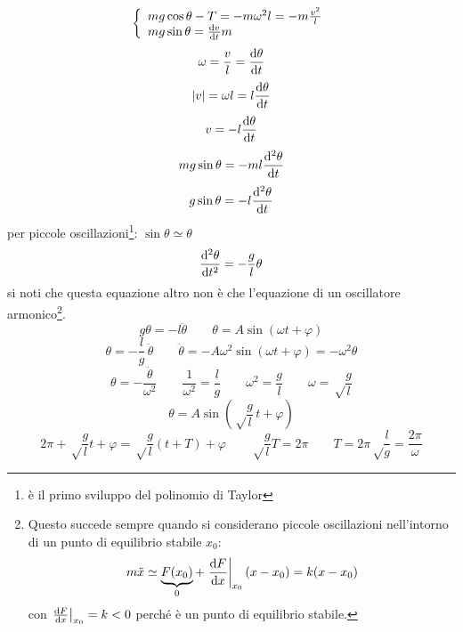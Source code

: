 \begin{equation*}\left\{
  \begin{array}{l}
  mg\cos\theta-T=-m\omega^2l=-m\frac{v^2}{l}\\
  mg\sin\theta=\frac{\mathrm{d} v}{\mathrm{d} t}m
  \end{array}
  \right.\end{equation*}
\begin{equation*}\omega=\frac{v}{l}=\frac{\mathrm{d}\theta}{\mathrm{d} t}\end{equation*}
\begin{equation*}|v|=\omega l=l\frac{\mathrm{d}\theta}{\mathrm{d} t}\end{equation*}
\begin{equation*}v=-l\frac{\mathrm{d}\theta}{\mathrm{d} t}\end{equation*}
\begin{equation*}mg\sin\theta=-ml\frac{\mathrm{d}^2\theta}{\mathrm{d} t}\end{equation*}
\begin{equation*}g\sin\theta=-l\frac{\mathrm{d}^2\theta}{\mathrm{d} t}\end{equation*}
per piccole oscillazioni\footnote{è il primo sviluppo del polinomio di Taylor}: $\sin\theta\simeq\theta$
\begin{equation*}\frac{\mathrm{d}^2\theta}{\mathrm{d} t^2}=-\frac{g}{l}\theta\end{equation*}
si noti che questa equazione altro non è che l'equazione di un oscillatore armonico\footnote{Questo succede sempre quando si considerano piccole oscillazioni nell'intorno di un punto di equilibrio stabile $x_0$:
\begin{equation*}
 m\ddot x \simeq \underbrace{F(x_0)}_0 + \left.\frac{\mathrm{d} F}{\mathrm{d} x}\right|_{x_0} (x-x_0) = k (x-x_0)
\end{equation*}
con $\left.\frac{\mathrm{d} F}{\mathrm{d} x}\right|_{x_0}=k<0$ perché è un punto di equilibrio stabile.
}.
$$g\theta=-l\ddot\theta\qquad \theta=A\sin\left(\omega
t+\varphi\right)$$
$$\theta=-\frac{l}{g}\,\ddot\theta\qquad\ddot\theta=-A\omega^2\sin\left(\omega
t+\varphi\right)=-\omega^2\theta$$
\begin{equation*}\theta=-\frac{\ddot\theta}{\omega^2}\qquad \frac{1}{\omega^2}=\frac{l}{g}\qquad\omega^2=\frac{g}{l}\qquad\omega=\sqrt\frac{g}{l}\end{equation*}
\begin{equation*}\theta=A\sin\left(\sqrt\frac{g}{l}\,t+\varphi\right)\end{equation*}
$$2\pi+\sqrt\frac{g}{l}t+\varphi=\sqrt\frac{g}{l}(t+T)+\varphi\qquad
\sqrt\frac{g}{l}T=2\pi\qquad
T=2\pi\sqrt\frac{l}{g}=\frac{2\pi}{\omega}$$

